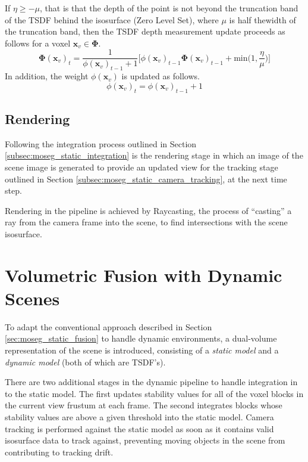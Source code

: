 If $\eta \geq -\mu$, that is that the depth of the point is not beyond the
truncation band of the TSDF behind the isosurface (Zero Level Set), where $\mu$ 
is half thewidth of the truncation band, then the TSDF depth measurement update 
proceeds as follows for a voxel $\mathbf{x}_{v} \in \mathbf{\Phi}$.
\begin{equation}
\label{eqn:sdf_update}
\mathbf{\Phi}(\mathbf{x}_{v})_{t} = \frac{1}{\phi(\mathbf{x}_{v})_{t-1} + 1}
\bigg[\phi(\mathbf{x}_{v})_{t-1}\mathbf{\mathbf{\Phi}}(\mathbf{x}_{v})_{t-1} +
\text{min} \bigg( 1, \frac{\eta}{\mu} \bigg)
\bigg]
\end{equation}
In addition, the weight $\phi(\mathbf{x}_{v})$ is updated as follows.
\begin{equation}
  \label{eqn:sdf_weight_update}
  \phi(\mathbf{x}_{v})_{t} = \phi(\mathbf{x}_{v})_{t-1} + 1
\end{equation}

\subsection{Rendering}
\label{subsec:moseg_static_rendering}
Following the integration process outlined in Section
\ref{subsec:moseg_static_integration} is the rendering stage in which an image
of the scene image is generated to provide an updated view for the tracking
stage outlined in Section \ref{subsec:moseg_static_camera_tracking}, at the next
time step.

Rendering in the pipeline is achieved by Raycasting, the process of ``casting'' a
ray from the camera frame into the scene, to find intersections with the scene
isosurface. 

\section{Volumetric Fusion with Dynamic Scenes}
\label{sec:moseg_dynamic_fusion}
To adapt the conventional approach described in Section
\ref{sec:moseg_static_fusion} to handle dynamic environments, a dual-volume
representation of the scene is introduced, consisting of a \emph{static model}
and a \emph{dynamic model} (both of which are TSDF's).

There are two additional stages in the dynamic pipeline to handle integration in
to the static model. The first updates stability values for all of the voxel
blocks in the current view frustum at each frame. The second integrates blocks
whose stability values are above a given threshold into the static model.
Camera tracking is performed against the static model as soon as it contains
valid isosurface data to track against, preventing moving objects in the scene
from contributing to tracking drift.

